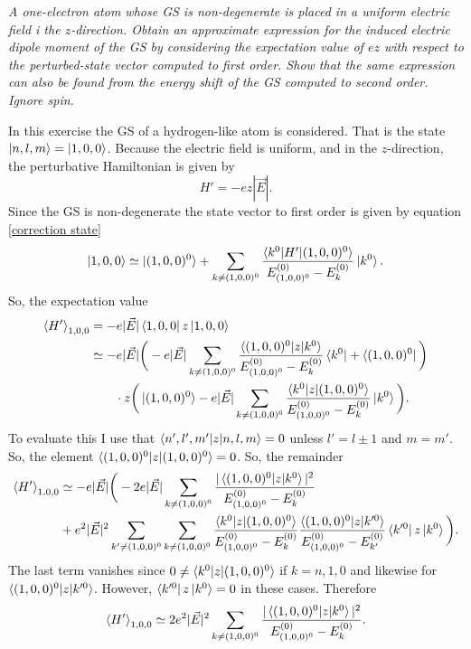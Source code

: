\begin{example}
	\emph{A one-electron atom whose GS is non-degenerate is placed in a uniform electric field i the $z$-direction. Obtain an approximate expression for the induced electric dipole moment of the GS by considering the expectation value of $ez$ with respect to the perturbed-state vector computed to first order. Show that the same expression can also be found from the energy shift of the GS computed to second order. Ignore spin.}\newline
	
	In this exercise the GS of a hydrogen-like atom is considered. That is the state $\ket{n,l,m}=\ket{1,0,0}$. Because the electric field is uniform, and in the $z$-direction, the perturbative Hamiltonian is given by
	\begin{equation}
		H'=-ez|\vec{E}|.
	\end{equation} 
	Since the GS is non-degenerate the state vector to first order is given by equation \eqref{correction state}
	\begin{equation}
		\ket{1,0,0}\simeq\ket{(1,0,0)^0}+\sum_{k\neq (1,0,0)^0}\frac{\braket{k^0|H'|(1,0,0)^0}}{E_{(1,0,0)^0}^{(0)}-E_{k}^{(0)}}\ket{k^0}.
	\end{equation} 
	So, the expectation value
	\begin{equation}
		\begin{split}
			\braket{H'}_{1,0,0}&=-e|\vec{E}|\bra{1,0,0}z\ket{1,0,0}\\
			&\simeq-e|\vec{E}|\bigg(-e|\vec{E}|\sum_{k\neq (1,0,0)^0}\frac{\braket{(1,0,0)^0|z|k^0}}{E_{(1,0,0)^0}^{(0)}-E_{k}^{(0)}}\bra{k^0}+\bra{(1,0,0)^0}\bigg)\\
			&\qquad\cdot z\bigg(\ket{(1,0,0)^0}-e|\vec{E}|\sum_{k\neq (1,0,0)^0}\frac{\braket{k^0|z|(1,0,0)^0}}{E_{(1,0,0)^0}^{(0)}-E_{k}^{(0)}}\ket{k^0}\bigg).
		\end{split}
	\end{equation} 	
	To evaluate this I use that $\braket{n',l',m'|z|n,l,m}=0$ unless $l'=l\pm1$ and $m=m'$. So, the element $\braket{(1,0,0)^0|z|(1,0,0)^0}=0$. So, the remainder
	\begin{equation}
		\begin{split}
			\braket{H'}_{1,0,0}&\simeq-e|\vec{E}|\bigg(-2e|\vec{E}|\sum_{k\neq (1,0,0)^0}\frac{|\braket{(1,0,0)^0|z|k^0}|^2}{E_{(1,0,0)^0}^{(0)}-E_{k}^{(0)}}\\
			&+e^2|\vec{E}|^2\sum_{k'\neq (1,0,0)^0}\sum_{k\neq (1,0,0)^0}\frac{\braket{k^0|z|(1,0,0)^0}}{E_{(1,0,0)^0}^{(0)}-E_{k}^{(0)}}\frac{\braket{(1,0,0)^0|z|k'^0}}{E_{(1,0,0)^0}^{(0)}-E_{k'}^{(0)}}\bra{k'^0}z\ket{k^0}\bigg).
		\end{split}
	\end{equation} 
	The last term vanishes since $0\neq \braket{k^0|z|(1,0,0)^0}$ if $k=n,1,0$ and likewise for $\braket{(1,0,0)^0|z|k'^0}$. However, $\bra{k'^0}z\ket{k^0}=0$ in these cases. Therefore
	\begin{equation}
		\braket{H'}_{1,0,0}\simeq 2e^2|\vec{E}|^2\sum_{k\neq (1,0,0)^0}\frac{|\braket{(1,0,0)^0|z|k^0}|^2}{E_{(1,0,0)^0}^{(0)}-E_{k}^{(0)}}.
	\end{equation} 
\end{example}

